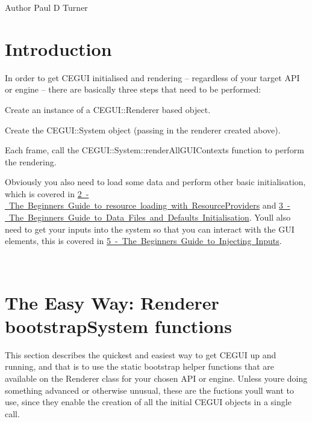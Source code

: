 \begin{DoxyAuthor}{Author}
Paul D Turner
\end{DoxyAuthor}
\hypertarget{rendering_tutorial_rendering_tutorial_intro}{}\section{Introduction}\label{rendering_tutorial_rendering_tutorial_intro}
In order to get C\+E\+G\+UI initialised and rendering -- regardless of your target A\+PI or engine -- there are basically three steps that need to be performed\+:
\begin{DoxyItemize}
\item Create an instance of a C\+E\+G\+U\+I\+::\+Renderer based object.
\item Create the C\+E\+G\+U\+I\+::\+System object (passing in the renderer created above).
\item Each frame, call the C\+E\+G\+U\+I\+::\+System\+::render\+All\+G\+U\+I\+Contexts function to perform the rendering.
\end{DoxyItemize}

Obviously you also need to load some data and perform other basic initialisation, which is covered in \mbox{\hyperlink{resprov_tutorial}{2 -\/ The Beginners Guide to resource loading with Resource\+Providers}} and \mbox{\hyperlink{datafile_tutorial}{3 -\/ The Beginners Guide to Data Files and Defaults Initialisation}}. You\textquotesingle{}ll also need to get your inputs into the system so that you can interact with the G\+UI elements, this is covered in \mbox{\hyperlink{input_tutorial}{5 -\/ The Beginners Guide to Injecting Inputs}}.

~\newline
 \hypertarget{rendering_tutorial_rendering_tutorial_bootstrap}{}\section{The Easy Way\+: Renderer \textquotesingle{}bootstrap\+System\textquotesingle{} functions}\label{rendering_tutorial_rendering_tutorial_bootstrap}
This section describes the quickest and easiest way to get C\+E\+G\+UI up and running, and that is to use the static \textquotesingle{}bootstrap\textquotesingle{} helper functions that are available on the Renderer class for your chosen A\+PI or engine. Unless you\textquotesingle{}re doing something advanced or otherwise unusual, these are the fuctions you\textquotesingle{}ll want to use, since they enable the creation of all the initial C\+E\+G\+UI objects in a single call.

